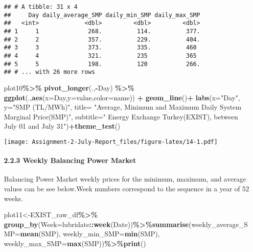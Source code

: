 \documentclass[
]{article}
\newenvironment{Shaded}{\begin{snugshade}}{\end{snugshade}}
\newcommand{\DataTypeTok}[1]{\textcolor[rgb]{0.13,0.29,0.53}{#1}}
\newcommand{\KeywordTok}[1]{\textcolor[rgb]{0.13,0.29,0.53}{\textbf{#1}}}
\newcommand{\NormalTok}[1]{#1}
\newcommand{\OperatorTok}[1]{\textcolor[rgb]{0.81,0.36,0.00}{\textbf{#1}}}
\newcommand{\StringTok}[1]{\textcolor[rgb]{0.31,0.60,0.02}{#1}}
\begin{document}
\begin{verbatim}
## # A tibble: 31 x 4
##     Day daily_average_SMP daily_min_SMP daily_max_SMP
##   <int>             <dbl>         <dbl>         <dbl>
## 1     1              268.          114.          377.
## 2     2              357.          229.          404.
## 3     3              373.          335.          460 
## 4     4              321.          235           365 
## 5     5              198.          120           266.
## # ... with 26 more rows
\end{verbatim}

\begin{Shaded}
\begin{Highlighting}[]
\NormalTok{plot10}\OperatorTok{\%\textgreater{}\%}\StringTok{ }\KeywordTok{pivot\_longer}\NormalTok{(.,}\OperatorTok{{-}}\NormalTok{Day) }\OperatorTok{\%\textgreater{}\%}\StringTok{ }\KeywordTok{ggplot}\NormalTok{(.,}\KeywordTok{aes}\NormalTok{(}\DataTypeTok{x=}\NormalTok{Day,}\DataTypeTok{y=}\NormalTok{value,}\DataTypeTok{color=}\NormalTok{name)) }\OperatorTok{+}\StringTok{ }\KeywordTok{geom\_line}\NormalTok{()}\OperatorTok{+}
\StringTok{      }\KeywordTok{labs}\NormalTok{(}\DataTypeTok{x=}\StringTok{"Day"}\NormalTok{, }\DataTypeTok{y=}\StringTok{"SMP (TL/MWh)"}\NormalTok{, }
           \DataTypeTok{title=}  \StringTok{"Average, Minimum and Maximum Daily System Marginal Price(SMP)"}\NormalTok{,}
           \DataTypeTok{subtitle=}\StringTok{" Energy Exchange Turkey(EXIST), between July 01 and July 31"}\NormalTok{)}\OperatorTok{+}\KeywordTok{theme\_test}\NormalTok{()}
\end{Highlighting}
\end{Shaded}

\texttt{[image: Assignment-2-July-Report\_files/figure-latex/14-1.pdf]}

\hypertarget{weekly-balancing-power-market}{%
\paragraph{2.2.3 Weekly Balancing Power
Market}\label{weekly-balancing-power-market}}

Balancing Power Market weekly prices for the minimum, maximum, and
average values can be see below.Week numbers correspond to the sequence
in a year of 52 weeks.

\begin{Shaded}
\begin{Highlighting}[]
\NormalTok{plot11\textless{}{-}EXIST\_raw\_df}\OperatorTok{\%\textgreater{}\%}\StringTok{ }\KeywordTok{group\_by}\NormalTok{(}\DataTypeTok{Week=}\NormalTok{lubridate}\OperatorTok{::}\KeywordTok{week}\NormalTok{(Date))}\OperatorTok{\%\textgreater{}\%}\KeywordTok{summarise}\NormalTok{(}\DataTypeTok{weekly\_average\_SMP=}\KeywordTok{mean}\NormalTok{(SMP), }\DataTypeTok{weekly\_min\_SMP=}\KeywordTok{min}\NormalTok{(SMP), }\DataTypeTok{weekly\_max\_SMP=}\KeywordTok{max}\NormalTok{(SMP))}\OperatorTok{\%\textgreater{}\%}\KeywordTok{print}\NormalTok{()}
\end{Highlighting}
\end{Shaded}
\end{document}
